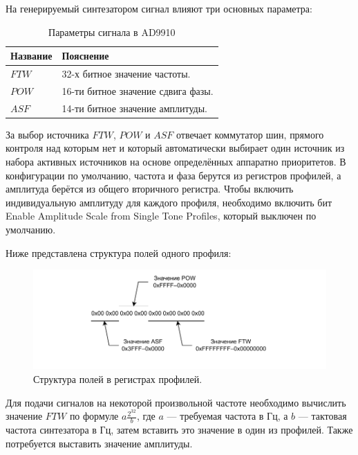 \documentclass[rusmathsym, eqnumwithinsec, amspack, hyperref]{bomgost}
\begin{document}
На генерируемый синтезатором сигнал влияют три основных параметра:

\begin{table}[H]
\centering
\caption{Параметры сигнала в AD9910}
\label{tab:signal_parameters}
\begin{tabular}{|p{4cm}|p{8cm}|}
\hline 
\textbf{Название} & \textbf{Пояснение} \\ 
\hline 
$FTW$ & 32-х битное значение частоты. \\ 
\hline
$POW$ & 16-ти битное значение сдвига фазы. \\
\hline
$ASF$ & 14-ти битное значение амплитуды. \\
\hline
\end{tabular} 
\end{table}

За выбор источника $FTW$, $POW$ и $ASF$ отвечает коммутатор шин, прямого контроля над которым нет и который автоматически выбирает один источник из набора активных источников на основе определённых аппаратно приоритетов. В конфигурации по умолчанию, частота и фаза берутся из регистров профилей, а амплитуда берётся из общего вторичного регистра. Чтобы включить индивидуальную амплитуду для каждого профиля, необходимо включить бит Enable Amplitude Scale from Single Tone Profiles, который выключен по умолчанию.

Ниже представлена структура полей одного профиля:

%
%
\begin{gostfigure}
\begin{figure}[H]
\centering
\includegraphics{data/single_tone_profile_register_layout.drawio.pdf}
\caption{Структура полей в регистрах профилей.}
\label{fig:single_tone_profile_register_layout}
\end{figure}
\end{gostfigure}

Для подачи сигналов на некоторой произвольной частоте необходимо вычислить значение $FTW$ по формуле $a\frac{2^{32}}{b}$, где $a$ --- требуемая частота в Гц, а $b$ --- тактовая частота синтезатора в Гц, затем вставить это значение в один из профилей. Также потребуется выставить значение амплитуды.
\end{document}
